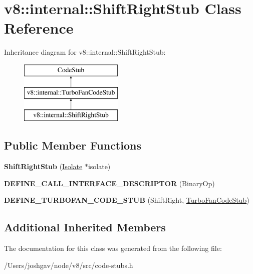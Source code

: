 \hypertarget{classv8_1_1internal_1_1_shift_right_stub}{}\section{v8\+:\+:internal\+:\+:Shift\+Right\+Stub Class Reference}
\label{classv8_1_1internal_1_1_shift_right_stub}
Inheritance diagram for v8\+:\+:internal\+:\+:Shift\+Right\+Stub\+:\begin{figure}[H]
\begin{center}
\leavevmode
\includegraphics[height=3.000000cm]{classv8_1_1internal_1_1_shift_right_stub}
\end{center}
\end{figure}
\subsection*{Public Member Functions}
\begin{DoxyCompactItemize}
\item 
{\bfseries Shift\+Right\+Stub} (\hyperlink{classv8_1_1internal_1_1_isolate}{Isolate} $\ast$isolate)\hypertarget{classv8_1_1internal_1_1_shift_right_stub_abebc6d6bc63633c4e5cef1195d5880a7}{}\label{classv8_1_1internal_1_1_shift_right_stub_abebc6d6bc63633c4e5cef1195d5880a7}

\item 
{\bfseries D\+E\+F\+I\+N\+E\+\_\+\+C\+A\+L\+L\+\_\+\+I\+N\+T\+E\+R\+F\+A\+C\+E\+\_\+\+D\+E\+S\+C\+R\+I\+P\+T\+OR} (Binary\+Op)\hypertarget{classv8_1_1internal_1_1_shift_right_stub_a45c9c5aff2ea72743e0cd74589b782da}{}\label{classv8_1_1internal_1_1_shift_right_stub_a45c9c5aff2ea72743e0cd74589b782da}

\item 
{\bfseries D\+E\+F\+I\+N\+E\+\_\+\+T\+U\+R\+B\+O\+F\+A\+N\+\_\+\+C\+O\+D\+E\+\_\+\+S\+T\+UB} (Shift\+Right, \hyperlink{classv8_1_1internal_1_1_turbo_fan_code_stub}{Turbo\+Fan\+Code\+Stub})\hypertarget{classv8_1_1internal_1_1_shift_right_stub_a6192f89e1396777896b92502b69c8f51}{}\label{classv8_1_1internal_1_1_shift_right_stub_a6192f89e1396777896b92502b69c8f51}

\end{DoxyCompactItemize}
\subsection*{Additional Inherited Members}


The documentation for this class was generated from the following file\+:\begin{DoxyCompactItemize}
\item 
/\+Users/joshgav/node/v8/src/code-\/stubs.\+h\end{DoxyCompactItemize}
